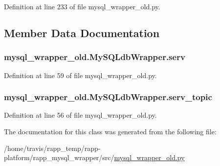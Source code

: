 Definition at line 233 of file mysql\-\_\-wrapper\-\_\-old.\-py.



\subsection{Member Data Documentation}
\hypertarget{classmysql__wrapper__old_1_1MySQLdbWrapper_abcac7ae4b4b405dbdfd6080adabf4eb0}{
\subsubsection[{serv}]{\setlength{\rightskip}{0pt plus 5cm}mysql\-\_\-wrapper\-\_\-old.\-My\-S\-Q\-Ldb\-Wrapper.\-serv}}\label{classmysql__wrapper__old_1_1MySQLdbWrapper_abcac7ae4b4b405dbdfd6080adabf4eb0}


Definition at line 59 of file mysql\-\_\-wrapper\-\_\-old.\-py.

\hypertarget{classmysql__wrapper__old_1_1MySQLdbWrapper_a592e1305b902af699be5e0a2c638c79c}{
\subsubsection[{serv\-\_\-topic}]{\setlength{\rightskip}{0pt plus 5cm}mysql\-\_\-wrapper\-\_\-old.\-My\-S\-Q\-Ldb\-Wrapper.\-serv\-\_\-topic}}\label{classmysql__wrapper__old_1_1MySQLdbWrapper_a592e1305b902af699be5e0a2c638c79c}


Definition at line 56 of file mysql\-\_\-wrapper\-\_\-old.\-py.



The documentation for this class was generated from the following file\-:\begin{DoxyCompactItemize}
\item 
/home/travis/rapp\-\_\-temp/rapp-\/platform/rapp\-\_\-mysql\-\_\-wrapper/src/\hyperlink{mysql__wrapper__old_8py}{mysql\-\_\-wrapper\-\_\-old.\-py}\end{DoxyCompactItemize}
